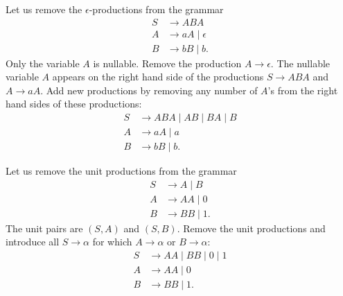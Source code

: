 \begin{page}

\begin{exl}
Let us remove the $\epsilon$-productions from the grammar
\begin{align*}
S &\to ABA\\
A &\to aA \mid \epsilon\\
B &\to bB \mid b.
\end{align*}
Only the variable $A$ is nullable.
Remove the production $A \to \epsilon$.
The nullable variable $A$ appears on the right hand side of the productions $S \to ABA$ and $A \to aA$.
Add new productions by removing any number of $A$'s from the right hand sides of these productions:
\begin{align*}
S &\to ABA \mid AB \mid BA \mid B\\
A &\to aA \mid a\\
B &\to bB \mid b.
\end{align*}
\end{exl}

\end{page}

\begin{page}

\begin{exl}
Let us remove the unit productions from the grammar
\begin{align*}
S &\to A \mid B\\
A &\to AA \mid 0\\
B &\to BB \mid 1.
\end{align*}
The unit pairs are $(S,A)$ and $(S,B)$.
Remove the unit productions and introduce all $S \to \alpha$ for which $A \to \alpha$ or $B \to \alpha$:
\begin{align*}
S &\to AA \mid BB \mid 0 \mid 1\\
A &\to AA \mid 0\\
B &\to BB \mid 1.
\end{align*}
\end{exl}

\end{page}

